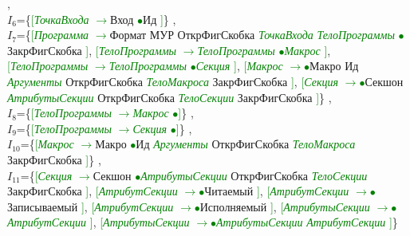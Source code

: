 \documentclass[a0]{a0poster}
\begin{document}
,\\
$I_{6}$=\{\textcolor{Green}{[}\textcolor{Green}{\textit{ТочкаВхода}} \textcolor{Green}{$\to$}Вход \textcolor{Green}{$\bullet$}Ид \textcolor{Green}{]}\}
,\\
$I_{7}$=\{\textcolor{Green}{[}\textcolor{Green}{\textit{Программа}} \textcolor{Green}{$\to$}Формат МУР ОткрФигСкобка \textcolor{Green}{\textit{ТочкаВхода}} \textcolor{Green}{\textit{ТелоПрограммы}} \textcolor{Green}{$\bullet$}ЗакрФигСкобка \textcolor{Green}{]}, \textcolor{Green}{[}\textcolor{Green}{\textit{ТелоПрограммы}} \textcolor{Green}{$\to$}\textcolor{Green}{\textit{ТелоПрограммы}} \textcolor{Green}{$\bullet$}\textcolor{Green}{\textit{Макрос}} \textcolor{Green}{]}, \textcolor{Green}{[}\textcolor{Green}{\textit{ТелоПрограммы}} \textcolor{Green}{$\to$}\textcolor{Green}{\textit{ТелоПрограммы}} \textcolor{Green}{$\bullet$}\textcolor{Green}{\textit{Секция}} \textcolor{Green}{]}, \textcolor{Green}{[}\textcolor{Green}{\textit{Макрос}} \textcolor{Green}{$\to$}\textcolor{Green}{$\bullet$}Макро Ид \textcolor{Green}{\textit{Аргументы}} ОткрФигСкобка \textcolor{Green}{\textit{ТелоМакроса}} ЗакрФигСкобка \textcolor{Green}{]}, \textcolor{Green}{[}\textcolor{Green}{\textit{Секция}} \textcolor{Green}{$\to$}\textcolor{Green}{$\bullet$}Секшон \textcolor{Green}{\textit{АтрибутыСекции}} ОткрФигСкобка \textcolor{Green}{\textit{ТелоСекции}} ЗакрФигСкобка \textcolor{Green}{]}\}
,\\
$I_{8}$=\{\textcolor{Green}{[}\textcolor{Green}{\textit{ТелоПрограммы}} \textcolor{Green}{$\to$}\textcolor{Green}{\textit{Макрос}} \textcolor{Green}{$\bullet$}\textcolor{Green}{]}\}
,\\
$I_{9}$=\{\textcolor{Green}{[}\textcolor{Green}{\textit{ТелоПрограммы}} \textcolor{Green}{$\to$}\textcolor{Green}{\textit{Секция}} \textcolor{Green}{$\bullet$}\textcolor{Green}{]}\}
,\\
$I_{10}$=\{\textcolor{Green}{[}\textcolor{Green}{\textit{Макрос}} \textcolor{Green}{$\to$}Макро \textcolor{Green}{$\bullet$}Ид \textcolor{Green}{\textit{Аргументы}} ОткрФигСкобка \textcolor{Green}{\textit{ТелоМакроса}} ЗакрФигСкобка \textcolor{Green}{]}\}
,\\
$I_{11}$=\{\textcolor{Green}{[}\textcolor{Green}{\textit{Секция}} \textcolor{Green}{$\to$}Секшон \textcolor{Green}{$\bullet$}\textcolor{Green}{\textit{АтрибутыСекции}} ОткрФигСкобка \textcolor{Green}{\textit{ТелоСекции}} ЗакрФигСкобка \textcolor{Green}{]}, \textcolor{Green}{[}\textcolor{Green}{\textit{АтрибутСекции}} \textcolor{Green}{$\to$}\textcolor{Green}{$\bullet$}Читаемый \textcolor{Green}{]}, \textcolor{Green}{[}\textcolor{Green}{\textit{АтрибутСекции}} \textcolor{Green}{$\to$}\textcolor{Green}{$\bullet$}Записываемый \textcolor{Green}{]}, \textcolor{Green}{[}\textcolor{Green}{\textit{АтрибутСекции}} \textcolor{Green}{$\to$}\textcolor{Green}{$\bullet$}Исполняемый \textcolor{Green}{]}, \textcolor{Green}{[}\textcolor{Green}{\textit{АтрибутыСекции}} \textcolor{Green}{$\to$}\textcolor{Green}{$\bullet$}\textcolor{Green}{\textit{АтрибутСекции}} \textcolor{Green}{]}, \textcolor{Green}{[}\textcolor{Green}{\textit{АтрибутыСекции}} \textcolor{Green}{$\to$}\textcolor{Green}{$\bullet$}\textcolor{Green}{\textit{АтрибутыСекции}} \textcolor{Green}{\textit{АтрибутСекции}} \textcolor{Green}{]}\}
\end{document}
